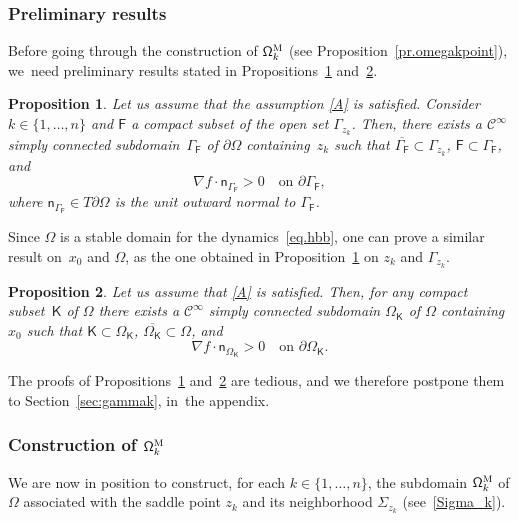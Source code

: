 \documentclass[10pt]{amsart}
\let\pa\partial
\theoremstyle{plain}
\newtheorem{proposition}{Proposition}
\theoremstyle{definition}
\begin{document}
\subsubsection{Preliminary results}
Before going through the construction of $\mathsf \Omega_k^{\textsc{M}}$ (see Proposition~\ref{pr.omegakpoint}), we~need preliminary results stated in Propositions~\ref{pr.gammak} and~\ref{pr.omegak}.

\begin{proposition}\label{pr.gammak}
Let us assume that the assumption \ref{A} is satisfied. Consider $k\in \{1,\ldots,n\}$ and $\mathsf F$ a compact subset of the open set $\Gamma_{z_k}$. Then, there exists a $\mathcal C^\infty$ simply connected subdomain~$\Gamma_{\mathsf F}$ of $\partial \Omega$ containing~$z_k$ such that $ \overline {\Gamma_{\mathsf F}} \subset \Gamma_{z_k}$, ${\mathsf F}\subset \Gamma_{\mathsf F}$, and
\begin{equation}\label{eq.ultrastable}
\nabla f\cdot \mathsf n_{ \Gamma_{\mathsf F} }>0 \quad\text{on } \pa \Gamma_{\mathsf F},
\end{equation}
where $\mathsf n_{ \Gamma_{\mathsf F}}\in T\partial \Omega$ is the
unit outward normal to $ \Gamma_{\mathsf F}$.
\end{proposition}
Since $\Omega$ is a stable domain for the dynamics~\eqref{eq.hbb},
one can prove a similar result on~$x_0$ and $\Omega$, as the one
obtained in Proposition~\ref{pr.gammak} on $z_k$ and $\Gamma_{z_k}$.

\begin{proposition}\label{pr.omegak}
Let us assume that \ref{A} is satisfied. Then, for any compact subset~$\mathsf K$ of $\Omega$ there exists a $\mathcal C^\infty $ simply connected subdomain $\Omega_{\mathsf K}$ of $\Omega$ containing $x_0$ such that $\mathsf K\subset \Omega_{\mathsf K}$, $\overline{\Omega_{\mathsf K}}\subset \Omega$, and
\[
\nabla f\cdot \mathsf n_{ \Omega_{\mathsf K}}> 0 \quad\text{on } \partial \Omega_{\mathsf K}.
\]
\end{proposition}

The proofs of Propositions~\ref{pr.gammak} and~\ref{pr.omegak} are
tedious, and we therefore postpone them to Section~\ref{sec:gammak}, in~the appendix.

\subsubsection{Construction of $\mathsf \Omega_k^{\textsc{M}}$}
We are now in position to construct, for each $k\in \{1,\ldots,n\}$,
the subdomain $\mathsf \Omega_k^{\textsc{M}}$ of $\Omega$ associated
with the saddle point $z_k$ and its neighborhood $\Sigma_{z_k}$ (see~\eqref{Sigma_k}).
\end{document}
